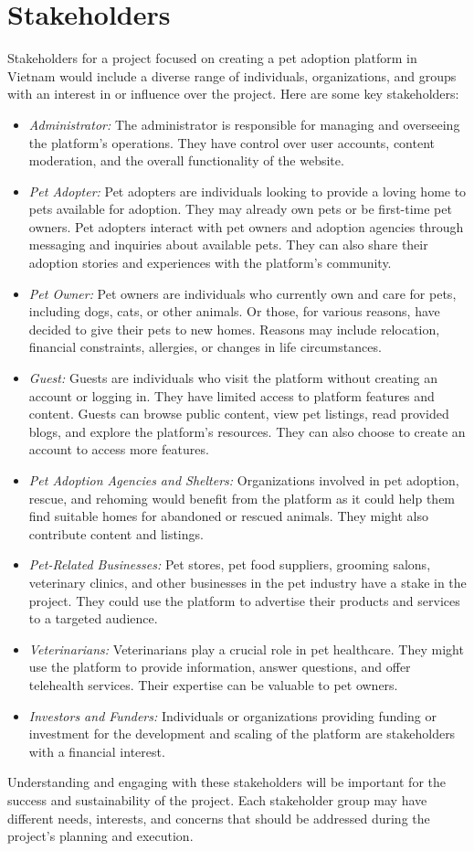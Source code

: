 \section{Stakeholders}
Stakeholders for a project focused on creating a pet adoption platform in Vietnam would include a diverse range of individuals, organizations, and groups with an interest in or influence over the project. Here are some key stakeholders:
\begin{itemize}
  \item \textit{Administrator:} The administrator is responsible for managing and overseeing the platform's operations. They have control over user accounts, content moderation, and the overall functionality of the website.
  \item \textit{Pet Adopter:} Pet adopters are individuals looking to provide a loving home to pets available for adoption. They may already own pets or be first-time pet owners. Pet adopters interact with pet owners and adoption agencies through messaging and inquiries about available pets. They can also share their adoption stories and experiences with the platform's community.
  \item \textit{Pet Owner:} Pet owners are individuals who currently own and care for pets, including dogs, cats, or other animals. Or those, for various reasons, have decided to give their pets to new homes. Reasons may include relocation, financial constraints, allergies, or changes in life circumstances.
  \item \textit{Guest:} Guests are individuals who visit the platform without creating an account or logging in. They have limited access to platform features and content. Guests can browse public content, view pet listings, read provided blogs, and explore the platform's resources. They can also choose to create an account to access more features.
  \item \textit{Pet Adoption Agencies and Shelters:} Organizations involved in pet adoption, rescue, and rehoming would benefit from the platform as it could help them find suitable homes for abandoned or rescued animals. They might also contribute content and listings.
  \item \textit{Pet-Related Businesses:} Pet stores, pet food suppliers, grooming salons, veterinary clinics, and other businesses in the pet industry have a stake in the project. They could use the platform to advertise their products and services to a targeted audience.
  \item \textit{Veterinarians:} Veterinarians play a crucial role in pet healthcare. They might use the platform to provide information, answer questions, and offer telehealth services. Their expertise can be valuable to pet owners.
  \item \textit{Investors and Funders:} Individuals or organizations providing funding or investment for the development and scaling of the platform are stakeholders with a financial interest.
\end{itemize}

Understanding and engaging with these stakeholders will be important for the success and sustainability of the project. Each stakeholder group may have different needs, interests, and concerns that should be addressed during the project's planning and execution.

